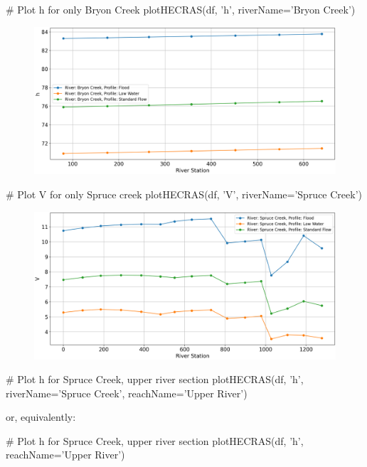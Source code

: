 \documentclass{article}
\begin{document}
\begin{python}
# Plot h for only Bryon Creek
plotHECRAS(df, 'h', riverName='Bryon Creek')
\end{python}

\begin{figure}[h]
    \centering
    \includegraphics[width=\textwidth]{bryonCreek_h.png}
\end{figure}

\begin{python}
# Plot V for only Spruce creek
plotHECRAS(df, 'V', riverName='Spruce Creek')
\end{python}

\begin{figure}[h]
    \centering
    \includegraphics[width=\textwidth]{spruceCreek_V.png}
\end{figure}

\newpage

\begin{python}
# Plot h for Spruce Creek, upper river section
plotHECRAS(df, 'h', riverName='Spruce Creek', 
                    reachName='Upper River')
\end{python}

or, equivalently:

\begin{python}
# Plot h for Spruce Creek, upper river section
plotHECRAS(df, 'h', reachName='Upper River')
\end{python}
\end{document}
